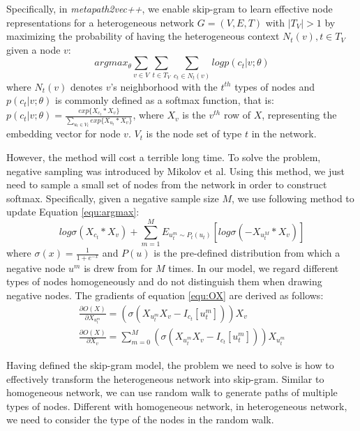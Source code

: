 \documentclass[conference]{IEEEtran}
\begin{document}
Specifically, in \emph{metapath2vec++}, we enable skip-gram to learn effective node representations for a heterogeneous network $G=(V,E,T)$ with $|T_V|>1$ by maximizing the probability of having the heterogeneous context $N_t(v),t\in T_V$ given a node $v$:
\begin{equation}
	arg max_{\theta}\sum_{v\in V}\sum_{t\in T_V}\sum_{c_t\in N_t(v)} log p(c_t|v;\theta)
\label{equ:argmax}
\end{equation}
where $N_t(v)$ denotes $v$'s neighborhood with the $t^{th}$ types of nodes and $p(c_t|v;\theta)$ is commonly defined as a softmax function, that is: $p(c_t|v;\theta)=\frac{exp\{X_{c_t}*X_v\}}{\sum_{u_t\in V_t}exp\{X_{u_t}*X_v\}}$, where $X_v$ is the $v^{th}$ row of $X$, representing the embedding vector for node $v$. $V_t$ is the node set of type $t$ in the network.

However, the method will cost a terrible long time. To solve the problem, negative sampling was introduced by Mikolov et al\cite{mikolov2013distributed}. Using this method, we just need to sample a small set of nodes from the network in order to construct softmax. Specifically, given a negative sample size $M$, we use following method to update Equation \ref{equ:argmax}:
\begin{equation}
log \sigma(X_{c_t}*X_v)+\sum_{m=1}^M E_{u_t^m\sim P_t(u_t)}[log \sigma(-X_{u_t^M}*X_v)]
\label{equ:OX}
\end{equation}
where $\sigma(x)=\frac{1}{1+e^{-x}}$ and $P(u)$ is the pre-defined distribution from which a negative node $u^m$ is drew from for $M$ times. In our model, we regard different types of nodes homogeneously and do not distinguish them when drawing negative nodes. The gradients of equation \ref{equ:OX} are derived as follows:
\begin{equation}\label{equ:gradient}
\begin{split}
\frac{\partial O(X)}{\partial X_{u_t^m}}=(\sigma(X_{u_t^m}X_v-I_{c_t}[u_t^m]))X_v\\
\frac{\partial O(X)}{\partial X_v}=\sum_{m=0}^M(\sigma(X_{u_t^m}X_v-I_{c_t}[u_t^m]))X_{u_t^m}
\end{split}
\end{equation}

Having defined the skip-gram model, the problem we need to solve is how to effectively transform the heterogeneous network into skip-gram. Similar to homogeneous network, we can use random walk to generate paths of multiple types of nodes. Different with homogeneous network, in heterogeneous network, we need to consider the type of the nodes in the random walk.
\end{document}
